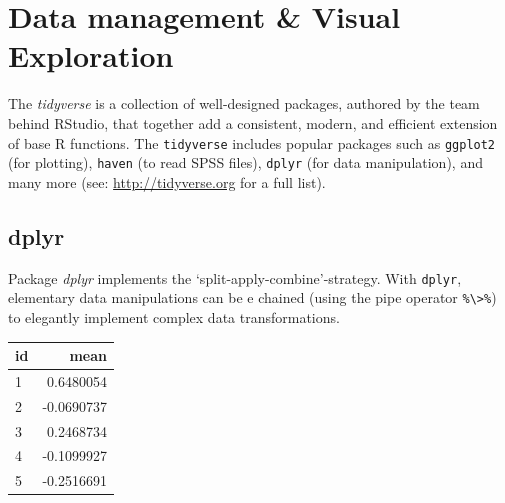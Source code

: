 \documentclass[]{book}
\newenvironment{Shaded}{\begin{snugshade}}{\end{snugshade}}
\newcommand{\KeywordTok}[1]{\textcolor[rgb]{0.13,0.29,0.53}{\textbf{#1}}}
\newcommand{\DataTypeTok}[1]{\textcolor[rgb]{0.13,0.29,0.53}{#1}}
\newcommand{\DecValTok}[1]{\textcolor[rgb]{0.00,0.00,0.81}{#1}}
\newcommand{\StringTok}[1]{\textcolor[rgb]{0.31,0.60,0.02}{#1}}
\newcommand{\CommentTok}[1]{\textcolor[rgb]{0.56,0.35,0.01}{\textit{#1}}}
\newcommand{\OperatorTok}[1]{\textcolor[rgb]{0.81,0.36,0.00}{\textbf{#1}}}
\newcommand{\NormalTok}[1]{#1}
\begin{document}
\section{Data management \& Visual
Exploration}\label{data-management-visual-exploration}


The \emph{tidyverse} is a collection of well-designed packages, authored
by the team behind RStudio, that together add a consistent, modern, and
efficient extension of base R functions. The \texttt{tidyverse} includes
popular packages such as \texttt{ggplot2} (for plotting), \texttt{haven}
(to read SPSS files), \texttt{dplyr} (for data manipulation), and many
more (see: \url{http://tidyverse.org} for a full list).

\subsection{dplyr}\label{dplyr}


Package \emph{dplyr} \citep{R-dplyr} implements the
`split-apply-combine'-strategy. With \texttt{dplyr}, elementary data
manipulations can be e chained (using the pipe operator
\texttt{\%\textbackslash{}\textgreater{}\%}) to elegantly implement
complex data transformations.

\begin{Shaded}
\end{Shaded}

\begin{tabular}{l|r}
\hline
id & mean\\
\hline
1 & 0.6480054\\
\hline
2 & -0.0690737\\
\hline
3 & 0.2468734\\
\hline
4 & -0.1099927\\
\hline
5 & -0.2516691\\
\hline
\end{tabular}
\end{document}
